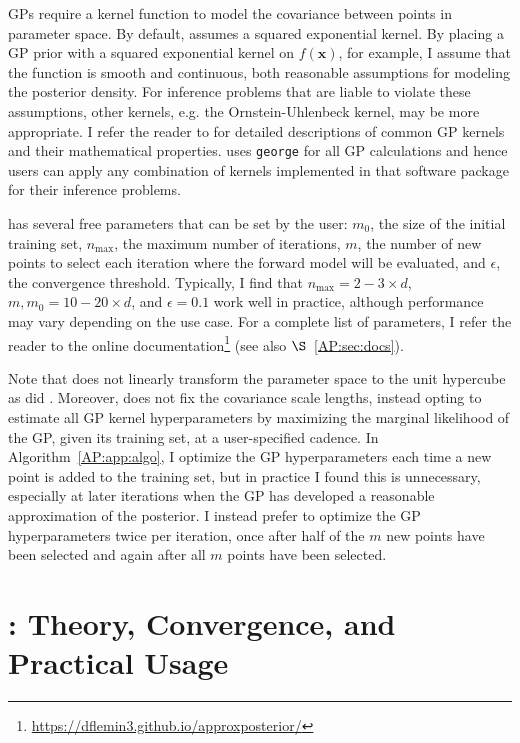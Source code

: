 GPs require a kernel function to model the covariance between points in parameter space. By default, \approxposterior assumes a squared exponential kernel. By placing a GP prior with a squared exponential kernel on $f(\textbf{x})$, for example, I assume that the function is smooth and continuous, both reasonable assumptions for modeling the posterior density. For inference problems that are liable to violate these assumptions, other kernels, e.g. the Ornstein-Uhlenbeck kernel, may be more appropriate. I refer the reader to \citet{Rasmussen2006} for detailed descriptions of common GP kernels and their mathematical properties. \approxposterior uses \texttt{george} \citep{george} for all GP calculations and hence users can apply any combination of kernels implemented in that software package for their inference problems.

\approxposterior has several free parameters that can be set by the user: $m_0$, the size of the initial training set, $n_{\mathrm{max}}$, the maximum number of iterations, $m$, the number of new points to select each iteration where the forward model will be evaluated, and $\epsilon$, the convergence threshold. Typically, I find that $n_{\mathrm{max}}=2-3 \times d$, $m, m_0 = 10-20 \times d$, and $\epsilon = 0.1$ work well in practice, although performance may vary depending on the use case. For a complete list of \approxposterior parameters, I refer the reader to the online documentation\footnote{ \href{https://dflemin3.github.io/approxposterior}{https://dflemin3.github.io/approxposterior/}} (see also $\S$~\ref{AP:sec:docs}).

Note that \approxposterior does not linearly transform the parameter space to the unit hypercube as did \citet{Kandasamy2017}. Moreover, \approxposterior does not fix the covariance scale lengths, instead opting to estimate all GP kernel hyperparameters by maximizing the marginal likelihood of the GP, given its training set, at a user-specified cadence. In Algorithm~\ref{AP:app:algo}, I optimize the GP hyperparameters each time a new point is added to the training set, but in practice I found this is unnecessary, especially at later iterations when the GP has developed a reasonable approximation of the posterior. I instead prefer to optimize the GP hyperparameters twice per iteration, once after half of the $m$ new points have been selected and again after all $m$ points have been selected.

\section{\approxposterior: Theory, Convergence, and Practical Usage} \label{ap:sec:usage}

